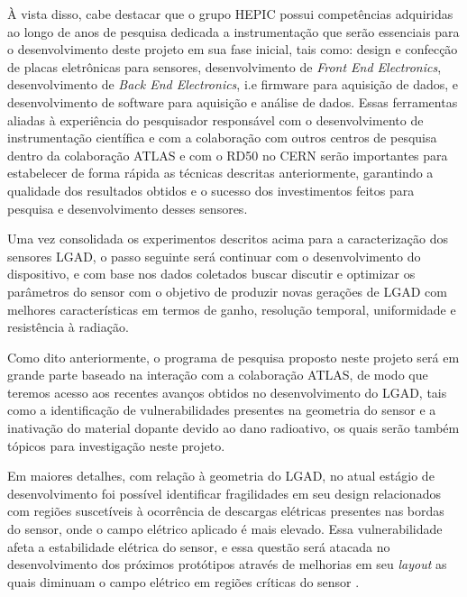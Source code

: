 À vista disso, cabe destacar que o grupo HEPIC possui competências adquiridas ao longo de anos de pesquisa dedicada a instrumentação que serão essenciais para o desenvolvimento deste projeto em sua fase inicial, tais como: design e confecção de placas eletrônicas para sensores, desenvolvimento de {\it Front End Electronics}, desenvolvimento de {\it Back End Electronics}, i.e firmware para aquisição de dados, e desenvolvimento de software para aquisição e análise de dados. Essas ferramentas aliadas à experiência do pesquisador responsável com o desenvolvimento de instrumentação científica \cite{tpcNIM,discharge_paper,THGEM} e com a colaboração com outros centros de pesquisa dentro da colaboração ATLAS e com o RD50 no CERN serão importantes para estabelecer de forma rápida as técnicas descritas anteriormente, garantindo a qualidade dos resultados obtidos e o sucesso dos investimentos feitos para pesquisa e desenvolvimento desses sensores. 

Uma vez consolidada os experimentos descritos acima para a caracterização dos sensores LGAD, o passo seguinte será continuar com o desenvolvimento do dispositivo, e com base nos dados coletados buscar discutir e optimizar os parâmetros do sensor com o objetivo de produzir novas gerações de LGAD com melhores características em termos de ganho, resolução temporal, uniformidade e resistência à radiação. 

Como dito anteriormente, o programa de pesquisa proposto neste projeto será em grande parte baseado na interação com a colaboração ATLAS, de modo que teremos acesso aos recentes avanços obtidos no desenvolvimento do LGAD, tais como a identificação de vulnerabilidades presentes na geometria do sensor e a inativação do material dopante devido ao dano radioativo, os quais serão também tópicos para investigação neste projeto.

Em maiores detalhes, com relação à geometria do LGAD, no atual estágio de desenvolvimento foi possível identificar fragilidades em seu design relacionados com regiões suscetíveis à ocorrência de descargas elétricas presentes nas bordas do sensor, onde o campo elétrico aplicado é mais elevado. Essa vulnerabilidade afeta a estabilidade elétrica do sensor, e essa questão será atacada no desenvolvimento dos próximos protótipos através de melhorias em seu {\it layout} as quais diminuam o campo elétrico em regiões críticas do sensor \cite{tdr}.  
   
